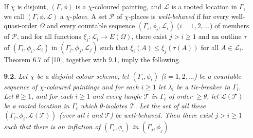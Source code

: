If $\chi$ is disjoint, $(\Gamma, \phi)$ is a $\chi$-coloured painting, and $\mathscr{L}$ is a rooted location in $\Gamma$, we call $(\Gamma, \phi, \mathscr{L})$ a $\chi$-\textit{place}. A set $\mathscr{P}$ of $\chi$-places is \textit{well-behaved} if for every well-quasi-order $\Omega$ and every countable sequence $(\Gamma_i, \phi_i, \mathscr{L}_i)$ ($i = 1, 2, \ldots$) of members of $\mathscr{P}$, and for all functions $\xi_i \colon \mathscr{L}_i \to E(\Omega)$, there exist $j > i \ge 1$ and an outline $\tau$ of $(\Gamma_i, \phi_i, \mathscr{L}_i)$ in $(\Gamma_j, \phi_j, \mathscr{L}_j)$ such that $\xi_i(A) \le \xi_j(\tau(A))$ for all $A \in \mathscr{L}_i$. Theorem 6.7 of [10], together with 9.1, imply the following.

\textbf{9.2.} \textit{Let $\chi$ be a disjoint colour scheme, let $(\Gamma_i, \phi_i)$ ($i = 1, 2, \ldots$) be a countable sequence of $\chi$-coloured paintings and for each $i \ge 1$ let $\lambda_i$ be a tie-breaker in $\Gamma_i$. Let $\theta \ge 1$, and for each $i \ge 1$ and every tangle $\mathscr{T}$ in $\Gamma_i$ of order $\ge \theta$, let $\mathscr{L}(\mathscr{T})$ be a rooted location in $\Gamma_i$ which $\theta$-isolates $\mathscr{T}$. Let the set of all these $(\Gamma_i, \phi_i, \mathscr{L}(\mathscr{T}))$ (over all $i$ and $\mathscr{T}$) be well-behaved. Then there exist $j > i \ge 1$ such that there is an inflation of $(\Gamma_i, \phi_i)$ in $(\Gamma_j, \phi_j)$.}

